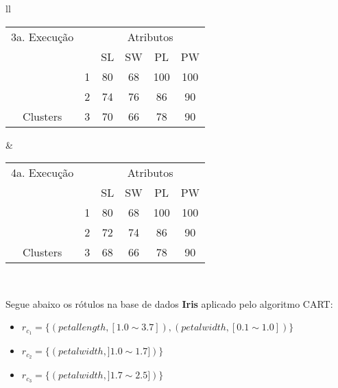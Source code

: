 \begin{table}[!h]
\begin{tabular}{ll}
   \small\addtolength{\tabcolsep}{-1pt}
     \begin{tabular}{|cl|c|c|c|c|}
        \hline \hline
         3a. Execução           &   & \multicolumn{4}{c|}{Atributos}                                               \\ \cline{3-6} 
       \multicolumn{1}{|l}{}                             &   & SL   & SW     & PL    & PW      \\ \hline
        \multicolumn{1}{|c|}{}                           & 1 & 80 & 68   & 100  & 100       \\ \cline{2-6} 
        \multicolumn{1}{|c|}{}                           & 2 & 74 & 76   & 86  &  90    \\ \cline{2-6} 
        \multicolumn{1}{|c|}{\multirow{-3}{*}{Clusters}} & 3 & 70 & 66   & 78  &   90   \\ \hline
      \end{tabular}
    
    &
    
 \small\addtolength{\tabcolsep}{-1pt}
     \begin{tabular}{|cl|c|c|c|c|}
        \hline \hline
        4a. Execução      &   & \multicolumn{4}{c|}{Atributos}                                               \\ \cline{3-6} 
       \multicolumn{1}{|l}{}                             &   & SL   & SW     & PL    & PW      \\ \hline
        \multicolumn{1}{|c|}{}                           & 1 & 80 & 68   & 100  &   100     \\ \cline{2-6} 
        \multicolumn{1}{|c|}{}                           & 2 & 72 & 74   & 86  &   90   \\ \cline{2-6} 
        \multicolumn{1}{|c|}{\multirow{-3}{*}{Clusters}} & 3 & 68 & 66   & 78  & 90     \\ \hline
      \end{tabular}
   \\
 
 \end{tabular}
 \label{tab:execucoes:iris:cart}
\end{table}


Segue abaixo os rótulos na base de dados \textbf{Iris} aplicado pelo algoritmo CART:
\begin{itemize}[noitemsep]
 \item ${r_{c_1}=\{ (petallength, [ 1.0 \sim 3.7]), (petalwidth,[ 0.1 \sim 1.0 ] ) \} }$  
 \item ${r_{c_2}=\{  (petalwidth,] 1.0 \sim 1.7 ] )\} }$
 \item ${r_{c_3}=\{ (petalwidth, ] 1.7 \sim 2.5 ]) \} }$
\end{itemize}


